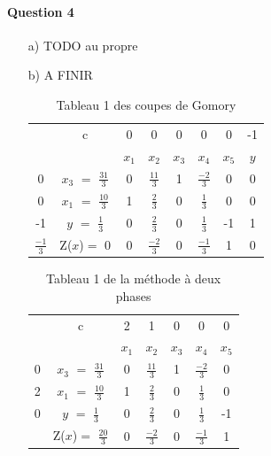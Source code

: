 \documentclass[a4paper, 12pt]{article}
\begin{document}
\paragraph{Question 4}
\begin{itemize}
\item[a)] TODO au propre
\item[b)] A FINIR 
\begin{table}[h!]	
\centering
	\begin{tabular}{|c|c|c|c|c|c|c|c|}
	\hline
      & c & 0 & 0 & 0 & 0 & 0 & -1 \\ 
      \cline{2-8}
       &  & $x_{1}$ & $x_{2}$  & $x_{3}$  & $x_{4}$ & $x_{5}$ & $y$ \\
       \hline
   0 & $x_{3}$  $=$ $\frac{31}{3}$ & 0 & $\frac{11}{3}$ & 1 & $\frac{-2}{3}$ & 0 & 0 \\
      \hline
	0 & $x_{1}$ $=$ $\frac{10}{3}$  & 1 & $\frac{2}{3}$ & 0 & $\frac{1}{3}$ & 0 & 0 \\
	  \hline
	  -1 & $y$ $=$ $\frac{1}{3}$  & 0 & $\frac{2}{3}$ & 0 & $\frac{1}{3}$ & -1 & 1 \\
	    \hline
	 $\frac{-1}{3}$ & Z($x$)$=$ 0 & 0 & $\frac{-2}{3}$ & 0 & $\frac{-1}{3}$ & 1 & 0\\
	  \hline
	\end{tabular}
\caption {Tableau 1 des coupes de Gomory}
\end{table}
\begin{table}[h!]	
\centering
	\begin{tabular}{|c|c|c|c|c|c|c|}
	\hline
      & c & 2 & 1 & 0 & 0 & 0 \\ 
      \cline{2-7}
       &  & $x_{1}$ & $x_{2}$  & $x_{3}$  & $x_{4}$ & $x_{5}$ \\
       \hline
   0 & $x_{3}$  $=$ $\frac{31}{3}$ & 0 & $\frac{11}{3}$ & 1 & $\frac{-2}{3}$ & 0 \\
      \hline
	2 & $x_{1}$ $=$ $\frac{10}{3}$  & 1 & $\frac{2}{3}$ & 0 & $\frac{1}{3}$ & 0 \\
	  \hline
	0 & $y$ $=$ $\frac{1}{3}$  & 0 & $\frac{2}{3}$ & 0 & $\frac{1}{3}$ & -1 \\
	  \hline
	 & Z($x$)$=$ $\frac{20}{3}$ & 0 & $\frac{-2}{3}$ & 0 & $\frac{-1}{3}$ & 1\\
	  \hline
	\end{tabular}
\caption {Tableau 1 de la méthode à deux phases}
\end{table}
\begin{table}[h!]	
\centering
	\begin{tabular}{|c|c|c|c|c|c|c|}

\end{tabular}
\end{table}
\end{itemize}
\end{document}
